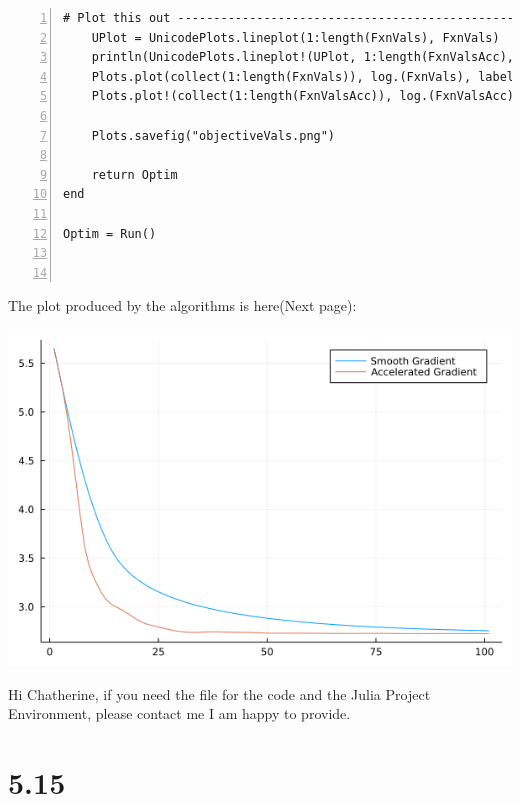 \documentclass[]{article}
\begin{document}
\begin{Verbatim}[numbers=left]
    # Plot this out ------------------------------------------------------------
    UPlot = UnicodePlots.lineplot(1:length(FxnVals), FxnVals)
    println(UnicodePlots.lineplot!(UPlot, 1:length(FxnValsAcc), FxnValsAcc))
    Plots.plot(collect(1:length(FxnVals)), log.(FxnVals), label="Smooth Gradient")
    Plots.plot!(collect(1:length(FxnValsAcc)), log.(FxnValsAcc), label="Accelerated Gradient")
    
    Plots.savefig("objectiveVals.png")

    return Optim
end

Optim = Run()

        
    \end{Verbatim}

The plot produced by the algorithms is here(Next page): 
\begin{center}
    \includegraphics[width=15cm]{objectiveVals.png}
\end{center}
Hi Chatherine, if you need the file for the code and the Julia Project Environment, please contact me I am happy to provide. 
\section*{5.15}
\end{document}

